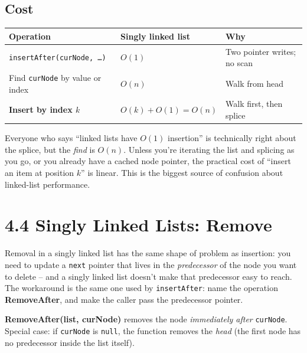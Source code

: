 \documentclass[11pt]{article}
\begin{document}
\subsection{Cost}

\begin{center}
\footnotesize
\renewcommand{\arraystretch}{1.3}
\begin{tabular}{@{}lll@{}}
\hline
\textbf{Operation}    & \textbf{Singly linked list} & \textbf{Why} \\
\hline
\texttt{insertAfter(curNode, \ldots)} & $O(1)$      & Two pointer writes; no scan \\
Find \texttt{curNode} by value or index & $O(n)$    & Walk from head \\
\textbf{Insert by index $k$}            & $O(k) + O(1) = O(n)$ & Walk first, then splice \\
\hline
\end{tabular}
\end{center}

\begin{warnbox}
Everyone who says ``linked lists have $O(1)$ insertion'' is
technically right about the splice, but the \emph{find} is
$O(n)$. Unless you're iterating the list and splicing as you go, or
you already have a cached node pointer, the practical cost of
``insert an item at position $k$'' is linear. This is the biggest
source of confusion about linked-list performance.
\end{warnbox}

\section{4.4 Singly Linked Lists: Remove}

Removal in a singly linked list has the same shape of problem as
insertion: you need to update a \texttt{next} pointer that lives in
the \emph{predecessor} of the node you want to delete -- and a
singly linked list doesn't make that predecessor easy to reach. The
workaround is the same one used by \texttt{insertAfter}: name the
operation \textbf{RemoveAfter}, and make the caller pass the
predecessor pointer.

\begin{defnbox}[RemoveAfter]
\textbf{RemoveAfter(list, curNode)} removes the node
\emph{immediately after} \texttt{curNode}. Special case: if
\texttt{curNode} is \texttt{null}, the function removes the
\emph{head} (the first node has no predecessor inside the list
itself).
\end{defnbox}
\end{document}
